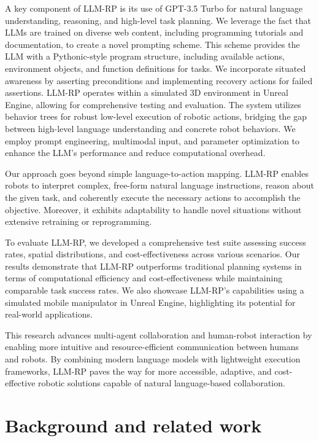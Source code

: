 \documentclass[pdflatex,sn-mathphys-num]{sn-jnl}%
\theoremstyle{thmstyleone}
\theoremstyle{thmstyletwo}%
\theoremstyle{thmstylethree}%
\begin{document}
A key component of LLM-RP is its use of GPT-3.5 Turbo for natural language understanding, reasoning, and high-level task planning. We leverage the fact that LLMs are trained on diverse web content, including programming tutorials and documentation, to create a novel prompting scheme. This scheme provides the LLM with a Pythonic-style program structure, including available actions, environment objects, and function definitions for tasks. We incorporate situated awareness by asserting preconditions and implementing recovery actions for failed assertions.
LLM-RP operates within a simulated 3D environment in Unreal Engine, allowing for comprehensive testing and evaluation. The system utilizes behavior trees for robust low-level execution of robotic actions, bridging the gap between high-level language understanding and concrete robot behaviors. We employ prompt engineering, multimodal input, and parameter optimization to enhance the LLM's performance and reduce computational overhead.


Our approach goes beyond simple language-to-action mapping. LLM-RP enables robots to interpret complex, free-form natural language instructions, reason about the given task, and coherently execute the necessary actions to accomplish the objective. Moreover, it exhibits adaptability to handle novel situations without extensive retraining or reprogramming.

To evaluate LLM-RP, we developed a comprehensive test suite assessing success rates, spatial distributions, and cost-effectiveness across various scenarios. Our results demonstrate that LLM-RP outperforms traditional planning systems in terms of computational efficiency and cost-effectiveness while maintaining comparable task success rates. We also showcase LLM-RP's capabilities using a simulated mobile manipulator in Unreal Engine, highlighting its potential for real-world applications.

This research advances multi-agent collaboration and human-robot interaction by enabling more intuitive and resource-efficient communication between humans and robots. By combining modern language models with lightweight execution frameworks, LLM-RP paves the way for more accessible, adaptive, and cost-effective robotic solutions capable of natural language-based collaboration.

\section{Background and related work}
\end{document}
